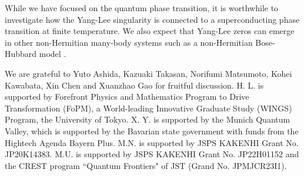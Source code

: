 \documentclass[aps,prl,twocolumn,superscriptaddress]{revtex4-1}
\begin{document}
\begin{bibunit}[apsrev4-2]
While we have focused on the quantum phase transition, it is worthwhile
to investigate how the Yang-Lee singularity is connected to a superconducting
phase transition at finite temperature. We also expect that Yang-Lee
zeros can emerge in other non-Hermitian many-body systems such as
a non-Hermitian Bose-Hubbard model \cite{PhysRevA.94.053615}.

We are grateful to Yuto Ashida, Kazuaki Takasan, Norifumi Matsumoto,
Kohei Kawabata, Xin Chen and Xuanzhao Gao for fruitful discussion.
H. L. is supported by Forefront Physics and Mathematics Program to
Drive Transformation (FoPM), a World-leading Innovative Graduate Study
(WINGS) Program, the University of Tokyo. X. Y. is supported by the
Munich Quantum Valley, which is supported by the Bavarian state government
with funds from the Hightech Agenda Bayern Plus. M.N. is supported
by JSPS KAKENHI Grant No. JP20K14383. M.U. is supported by JSPS KAKENHI
Grant No. JP22H01152 and the CREST program ``Quantum Frontiers" of JST (Grand No. JPMJCR23I1).
%
\putbib[MyCollection]
\end{bibunit}
\end{document}
